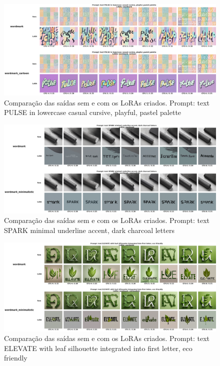 \documentclass[12pt, %
openright, 
oneside, %
a4paper,    %
brazil]{facom-ufu-abntex2}
\begin{document}
\begin{figure}[H]
    \centering
    \includegraphics[width=1.0\linewidth]{figuras/resultados/good/wordmark/cmp_p4_batch1.png}
    \caption[7º Comparação das saídas sem e com os LoRAs criados.]{Comparação das saídas sem e com os LoRAs criados. Prompt: text PULSE in lowercase casual cursive, playful, pastel palette}
    \label{fig:wordmarkCmpP4Batch1}
\end{figure}

\begin{figure}[H]
    \centering
    \includegraphics[width=1.0\linewidth]{figuras/resultados/good/wordmark/cmp_p28_batch0.png}
    \caption[8º Comparação das saídas sem e com os LoRAs criados.]{Comparação das saídas sem e com os LoRAs criados. Prompt: text SPARK minimal underline accent, dark charcoal letters}
    \label{fig:wordmarkCmpP28Batch0}
\end{figure}

\begin{figure}[H]
    \centering
    \includegraphics[width=1.0\linewidth]{figuras/resultados/good/wordmark/cmp_p20_batch3.png}
    \caption[9º Comparação das saídas sem e com os LoRAs criados.]{Comparação das saídas sem e com os LoRAs criados. Prompt: text ELEVATE with leaf silhouette integrated into first letter, eco friendly}
    \label{fig:wordmarkCmpP20Batch3}
\end{figure}
\end{document}
